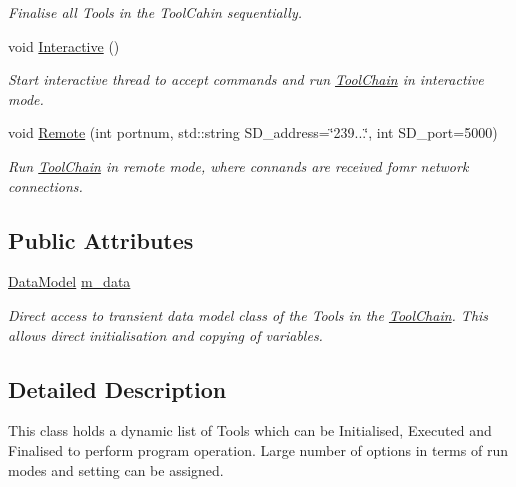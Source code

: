 \begin{DoxyCompactItemize}
\begin{DoxyCompactList}\small\item\em Finalise all Tools in the Tool\-Cahin sequentially. \end{DoxyCompactList}\item 
\hypertarget{classToolChain_a9bb47b83b6b85c3b0fab75af0cda19bf}{void \hyperlink{classToolChain_a9bb47b83b6b85c3b0fab75af0cda19bf}{Interactive} ()}\label{classToolChain_a9bb47b83b6b85c3b0fab75af0cda19bf}

\begin{DoxyCompactList}\small\item\em Start interactive thread to accept commands and run \hyperlink{classToolChain}{Tool\-Chain} in interactive mode. \end{DoxyCompactList}\item 
void \hyperlink{classToolChain_aacc213c07f81ee202dce14856a076df3}{Remote} (int portnum, std\-::string S\-D\-\_\-address=\char`\"{}239...\char`\"{}, int S\-D\-\_\-port=5000)
\begin{DoxyCompactList}\small\item\em Run \hyperlink{classToolChain}{Tool\-Chain} in remote mode, where connands are received fomr network connections. \end{DoxyCompactList}\end{DoxyCompactItemize}
\subsection*{Public Attributes}
\begin{DoxyCompactItemize}
\item 
\hypertarget{classToolChain_a92c81316d0c0b16ee9e4a084dd976f83}{\hyperlink{classDataModel}{Data\-Model} \hyperlink{classToolChain_a92c81316d0c0b16ee9e4a084dd976f83}{m\-\_\-data}}\label{classToolChain_a92c81316d0c0b16ee9e4a084dd976f83}

\begin{DoxyCompactList}\small\item\em Direct access to transient data model class of the Tools in the \hyperlink{classToolChain}{Tool\-Chain}. This allows direct initialisation and copying of variables. \end{DoxyCompactList}\end{DoxyCompactItemize}


\subsection{Detailed Description}
This class holds a dynamic list of Tools which can be Initialised, Executed and Finalised to perform program operation. Large number of options in terms of run modes and setting can be assigned.

